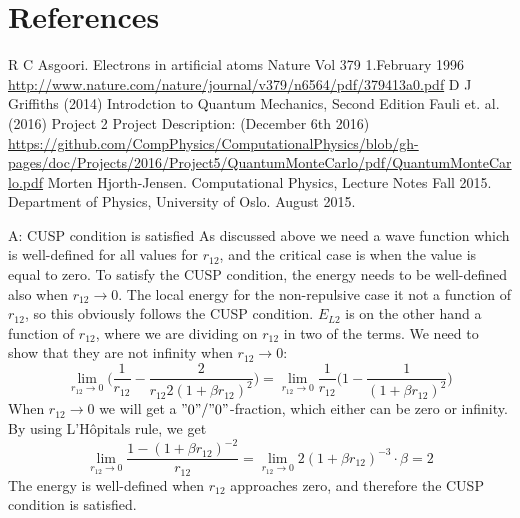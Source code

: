 \documentclass[norsk,a4paper,12pt]{article}
\begin{document}
\section{References}
\begingroup
\renewcommand{\section}[2]{}
\begin{thebibliography}{}
  R C Asgoori. 
  Electrons in artificial atoms
  Nature Vol 379 1.February 1996
  \url{http://www.nature.com/nature/journal/v379/n6564/pdf/379413a0.pdf}
  D J Griffiths (2014)
  Introdction to Quantum Mechanics, Second Edition
  Fauli et. al. (2016)
  Project 2
  Project Description: 					(December 6th 2016)\newline
  \url{https://github.com/CompPhysics/ComputationalPhysics/blob/gh-  pages/doc/Projects/2016/Project5/QuantumMonteCarlo/pdf/QuantumMonteCarlo.pdf}
  Morten Hjorth-Jensen.
  Computational Physics, Lecture Notes Fall 2015.
  Department of Physics, University of Oslo.
  August 2015.
\end{thebibliography}
\endgroup
\newpage
\section{Appendices}

\subsection{A: CUSP condition is satisfied}
As discussed above we need a wave function which is well-defined for all values for $r_{12}$, and the critical case is when the value is equal to zero. To satisfy the CUSP condition, the energy needs to be well-defined also when $r_{12}\rightarrow 0$. The local energy for the non-repulsive case it not a function of $r_{12}$, so this obviously follows the CUSP condition. $E_{L2}$ is on the other hand a function of $r_{12}$, where we are dividing on $r_{12}$ in two of the terms. We need to show that they are not infinity when $r_{12}\rightarrow0$:
\begin{equation}
\lim_{r_{12}\rightarrow0}\bigg(\frac{1}{r_{12}}-\frac{2}{r_{12}2(1+\beta r_{12})^2}\bigg)=\lim_{r_{12}\rightarrow0}\frac{1}{r_{12}}\bigg(1-\frac{1}{(1+\beta r_{12})^2}\bigg)
\end{equation}
When $r_{12}\rightarrow0$ we will get a $"0"/"0"$-fraction, which either can be zero or infinity. By using L'H\^{o}pitals rule, we get
\begin{equation}
\lim_{r_{12}\rightarrow0}\frac{1-(1+\beta r_{12})^{-2}}{r_{12}}=\lim_{r_{12}\rightarrow0}2(1+\beta r_{12})^{-3}\cdot \beta=2
\end{equation}
The energy is well-defined when $r_{12}$ approaches zero, and therefore the CUSP condition is satisfied.  
\end{document}
